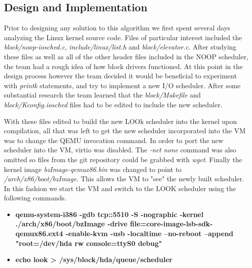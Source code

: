 \documentclass[10pt,onecolumn,draftclsnofoot]{IEEEtran} %
\begin{document}
\newpage
\begin{singlespace}
\section{\bf  Design and Implementation}

  \normalfont \indent Prior to designing any solution to this algorithm we first spent several days analyzing the Linux kernel source code. Files of particular interest included the \textit{block/noop-iosched.c}, \textit{include/linux/list.h} and \textit{block/elevator.c}. After studying these files as well as all of the other header files included in the NOOP scheduler, the team had a rough idea of how block drivers functioned. At this point in the design process however the team decided it would be beneficial to experiment with \textit{printk} statements, and try to implement a new I/O scheduler. After some substantial research the team learned that the \textit{block/Makefile} and \textit{block/Kconfig.iosched} files had to be edited to include the new scheduler.

  \normalfont \indent With these files edited to build the new LOOk scheduler into the kernel upon compilation, all that was left to get the new scheduler incorporated into the VM was to change the QEMU invocation command. In order to port the new scheduler into the VM, virtio was disabled. The \textit{-net none} command was also omitted so files from the git repository could be grabbed with \textit{wget}. Finally the kernel image \textit{bzImage-qemux86.bin} was changed to point to \textit{/arch/x86/boot/bzImage}. This allows the VM to "see" the newly built scheduler. In this fashion we start the VM and switch to the LOOK scheduler using the following commands.

  \begin{itemize}
        \item \textbf{qemu-system-i386 -gdb tcp::5510 -S -nographic -kernel ./arch/x86/boot/bzImage -drive file=core-image-lsb-sdk-qemux86.ext4 -enable-kvm -usb -localtime --no-reboot --append "root=/dev/hda rw console=ttyS0 debug"}
        \item \textbf{echo look > /sys/block/hda/queue/scheduler}
  \end{itemize}


\end{singlespace}
\end{document}
